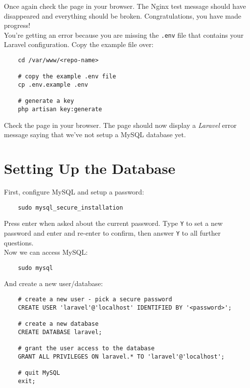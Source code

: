 Once again check the page in your browser. The Nginx test message should have disappeared and everything should be broken. Congratulations, you have made progress!
\\

You're getting an error because you are missing the \texttt{.env} file that contains your Laravel configuration. Copy the example file over:

\begin{verbatim}
    cd /var/www/<repo-name>

    # copy the example .env file
    cp .env.example .env

    # generate a key
    php artisan key:generate
\end{verbatim}

Check the page in your browser. The page should now display a \textit{Laravel} error message saying that we've not setup a MySQL database yet.


\section{Setting Up the Database}

First, configure MySQL and setup a password:

\begin{verbatim}
    sudo mysql_secure_installation
\end{verbatim}

Press enter when asked about the current password. Type \texttt{Y} to set a new password and enter and re-enter to confirm, then answer \texttt{Y} to all further questions.
\\

Now we can access MySQL:

\begin{verbatim}
    sudo mysql
\end{verbatim}

And create a new user/database:

\begin{verbatim}
    # create a new user - pick a secure password
    CREATE USER 'laravel'@'localhost' IDENTIFIED BY '<password>';

    # create a new database
    CREATE DATABASE laravel;

    # grant the user access to the database
    GRANT ALL PRIVILEGES ON laravel.* TO 'laravel'@'localhost';

    # quit MySQL
    exit;
\end{verbatim}


